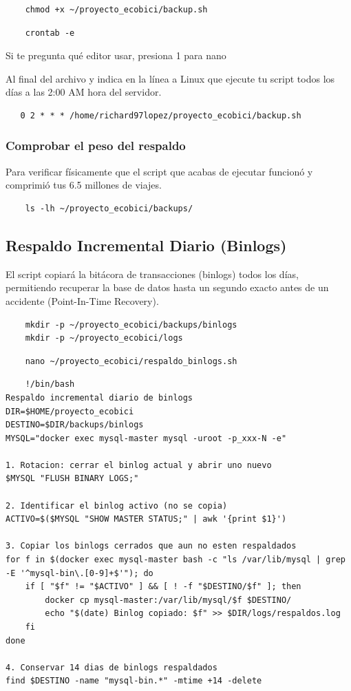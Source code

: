 \documentclass[10pt,a4paper]{article}
\begin{document}
\begin{lstlisting}
    chmod +x ~/proyecto_ecobici/backup.sh
\end{lstlisting}

\begin{lstlisting}
    crontab -e
\end{lstlisting}
Si te pregunta qué editor usar, presiona 1 para nano

Al final del archivo y  indica en la línea a 
Linux que ejecute tu script todos los días a las 2:00 AM hora del servidor.
\begin{lstlisting}
   0 2 * * * /home/richard97lopez/proyecto_ecobici/backup.sh
\end{lstlisting}

\subsubsection{Comprobar el peso del respaldo}
Para verificar físicamente que el script que acabas de 
ejecutar funcionó y comprimió tus 6.5 millones de viajes.

\begin{lstlisting}
    ls -lh ~/proyecto_ecobici/backups/
\end{lstlisting}

\subsection{Respaldo Incremental Diario (Binlogs)}

El script copiará la bitácora de transacciones (binlogs) todos los días,
permitiendo recuperar la base de datos hasta un segundo exacto 
antes de un accidente (Point-In-Time Recovery).

\begin{lstlisting}
    mkdir -p ~/proyecto_ecobici/backups/binlogs
    mkdir -p ~/proyecto_ecobici/logs
\end{lstlisting}

\begin{lstlisting}
    nano ~/proyecto_ecobici/respaldo_binlogs.sh
\end{lstlisting}

\begin{lstlisting}
    !/bin/bash
Respaldo incremental diario de binlogs
DIR=$HOME/proyecto_ecobici
DESTINO=$DIR/backups/binlogs
MYSQL="docker exec mysql-master mysql -uroot -p_xxx-N -e"

1. Rotacion: cerrar el binlog actual y abrir uno nuevo
$MYSQL "FLUSH BINARY LOGS;"

2. Identificar el binlog activo (no se copia)
ACTIVO=$($MYSQL "SHOW MASTER STATUS;" | awk '{print $1}')

3. Copiar los binlogs cerrados que aun no esten respaldados
for f in $(docker exec mysql-master bash -c "ls /var/lib/mysql | grep -E '^mysql-bin\.[0-9]+$'"); do
    if [ "$f" != "$ACTIVO" ] && [ ! -f "$DESTINO/$f" ]; then
        docker cp mysql-master:/var/lib/mysql/$f $DESTINO/
        echo "$(date) Binlog copiado: $f" >> $DIR/logs/respaldos.log
    fi
done

4. Conservar 14 dias de binlogs respaldados
find $DESTINO -name "mysql-bin.*" -mtime +14 -delete
\end{lstlisting}
\end{document}
